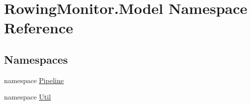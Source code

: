 \hypertarget{namespace_rowing_monitor_1_1_model}{}\section{Rowing\+Monitor.\+Model Namespace Reference}
\label{namespace_rowing_monitor_1_1_model}
\subsection*{Namespaces}
\begin{DoxyCompactItemize}
\item 
namespace \hyperlink{namespace_rowing_monitor_1_1_model_1_1_pipeline}{Pipeline}
\item 
namespace \hyperlink{namespace_rowing_monitor_1_1_model_1_1_util}{Util}
\end{DoxyCompactItemize}
